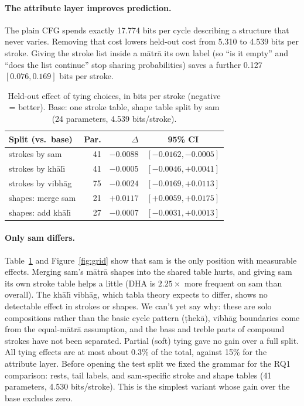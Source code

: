 \documentclass[11pt]{article}
\newcommand{\matra}{m\=atr\=a}
\newcommand{\vibhag}{vibh\=ag}
\newcommand{\khali}{kh\=al\={\i}}
\begin{document}
\paragraph{The attribute layer improves prediction.} The plain CFG spends
exactly 17.774 bits per cycle describing a structure that never varies. Removing
that cost lowers held-out cost from 5.310 to 4.539 bits per stroke. Giving the
stroke list inside a \matra{} its own label (so ``is it empty'' and ``does the
list continue'' stop sharing probabilities) saves a further 0.127
$[0.076, 0.169]$ bits per stroke.

\begin{table}[t]
\centering\small
\setlength{\tabcolsep}{3pt}
\begin{tabular}{lrrc}
\toprule
Split (vs.\ base) & Par. & $\Delta$ & 95\% CI \\
\midrule
strokes by sam & 41 & $-0.0088$ & $[-0.0162, -0.0005]$ \\
strokes by \khali{} & 41 & $-0.0005$ & $[-0.0046, +0.0041]$ \\
strokes by \vibhag{} & 75 & $-0.0024$ & $[-0.0169, +0.0113]$ \\
shapes: merge sam & 21 & $+0.0117$ & $[+0.0059, +0.0175]$ \\
shapes: add \khali{} & 27 & $-0.0007$ & $[-0.0031, +0.0013]$ \\
\bottomrule
\end{tabular}
\caption{Held-out effect of tying choices, in bits per stroke (negative =
better). Base: one stroke table, shape table split by sam (24 parameters,
4.539 bits/stroke).}
\label{tab:tying}
\end{table}

\paragraph{Only sam differs.} Table~\ref{tab:tying} and
Figure~\ref{fig:grid} show that sam is the only position with measurable
effects. Merging sam's \matra{} shapes into the shared table hurts, and giving
sam its own stroke table helps a little (DHA is $2.25\times$ more frequent on
sam than overall). The \khali{} \vibhag{}, which tabla theory expects to differ, shows no
detectable effect in strokes or shapes. We can't yet say why: these are solo
compositions rather than the basic cycle pattern (\d{t}hek\=a), \vibhag{}
boundaries come from the equal-\matra{} assumption, and the bass and treble
parts of compound strokes have not been separated. Partial (soft) tying gave
no gain over a full split. All tying effects are at most about 0.3\% of the
total, against 15\% for the attribute layer. Before opening the test split we fixed
the grammar for the RQ1 comparison: rests, tail labels, and sam-specific
stroke and shape tables (41 parameters, 4.530 bits/stroke). This is the
simplest variant whose gain over the base excludes zero.
\end{document}
